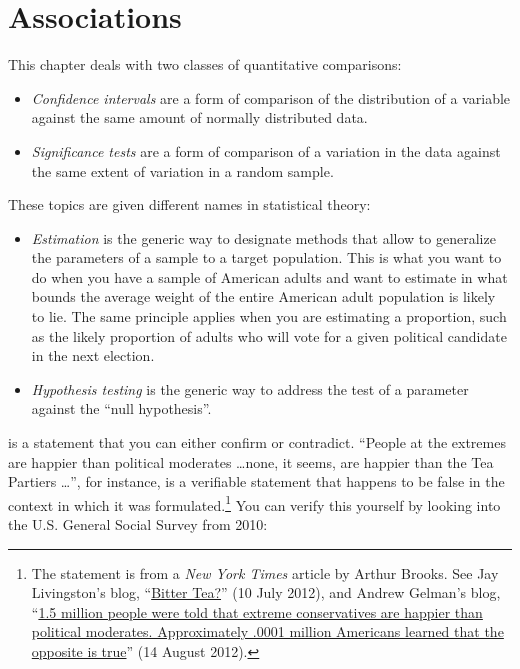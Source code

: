 \chapter{Associations}%
	\label{ch:associations}%
  \minitoc
  \newpage

This chapter deals with two classes of quantitative comparisons:

\begin{itemize}
  \item \emph{Confidence intervals} are a form of comparison of the distribution of a variable against the same amount of normally distributed data. %
  \item \emph{Significance tests} are a form of comparison of a variation in the data against the same extent of variation in a random sample. %
\end{itemize}

These topics are given different names in statistical theory:

\begin{itemize}
  \item \emph{Estimation} is the generic way to designate methods that allow to generalize the parameters of a sample to a target population. This is what you want to do when you have a sample of American adults and want to estimate in what bounds the average weight of the entire American adult population is likely to lie. The same principle applies when you are estimating a proportion, such as the likely proportion of adults who will vote for a given political candidate in the next election. %
  \item \emph{Hypothesis testing} is the generic way to address the test of a parameter against the ``null hypothesis''.
\end{itemize}

 is a statement that you can either confirm or contradict. ``People at the extremes are happier than political moderates \dots none, it seems, are happier than the Tea Partiers \dots'', for instance, is a verifiable statement that happens to be false in the context in which it was formulated.\footnote{The statement is from a \emph{New York Times} article by Arthur Brooks. See Jay Livingston's blog, ``\href{http://montclairsoci.blogspot.ch/2012/07/bitter-tea.html}{Bitter Tea?}'' (10 July 2012), and Andrew Gelman's blog, ``\href{http://andrewgelman.com/2012/08/1-5-million-people-were-told-that-extreme-conservatives-are-happier-than-political-moderates-approximately-0001-million-americans-learned-that-the-opposite-is-true/}{1.5 million people were told that extreme conservatives are happier than political moderates. Approximately .0001 million Americans learned that the opposite is true}'' (14 August 2012).} You can verify this yourself by looking into the U.S. General Social Survey from 2010:%

